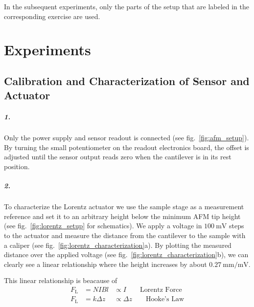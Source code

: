 \documentclass[a4paper,twoside,11pt,DIV=13,BCOR=5mm,numbers=noenddot]{scrbook}
\begin{document}
In the subsequent experiments, only the parts of the setup that are labeled in the corresponding exercise are used.

\chapter{Experiments}
\section{Calibration and Characterization of Sensor and Actuator}


\paragraph*{1.}


Only the power supply and sensor readout is connected (see fig.~\ref{fig:afm_setup}). By turning the small potentiometer on the readout electronics board, the offset is adjusted until the sensor output reads zero
when the cantilever is in its rest position.


\paragraph*{2.}


To characterize the Lorentz actuator we use the sample stage as a measurement reference and set it to an arbitrary height below the minimum AFM tip height (see fig.~\ref{fig:lorentz_setup} for schematics).
We apply a voltage in $\qty{100}{\mV}$ steps to the actuator and measure the distance from the cantilever to the sample with a caliper (see fig.~\ref{fig:lorentz_characterization}a).
By plotting the measured distance over the applied voltage (see fig.~\ref{fig:lorentz_characterization}b), we can clearly see a linear relationship where the height increases by about $\qty{0.27}{\mm\per\mV}$.

This linear relationship is beacause of
$$\begin{aligned}
F_\mathrm{L} &= N I B l &\propto I \qquad \text{Lorentz Force}\\
F_\mathrm{L} &= k \Delta z &\propto \Delta z \qquad \text{Hooke's Law}\\
\end{aligned}$$
\end{document}
